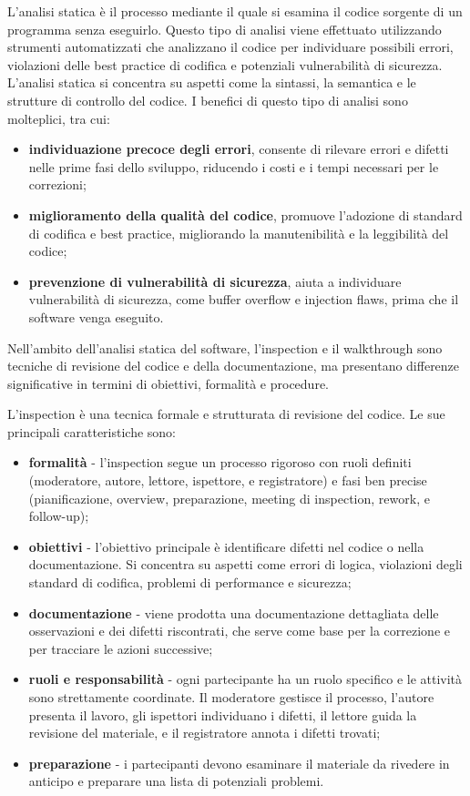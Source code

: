 L'analisi statica è il processo mediante il quale si esamina il codice sorgente di un programma senza eseguirlo. Questo tipo di analisi viene effettuato utilizzando strumenti automatizzati che analizzano il codice per individuare possibili errori, violazioni delle best practice di codifica e potenziali vulnerabilità di sicurezza. L'analisi statica si concentra su aspetti come la sintassi, la semantica e le strutture di controllo del codice. I benefici di questo tipo di analisi sono molteplici, tra cui:
\begin{itemize}
	\item \textbf{individuazione precoce degli errori}, consente di rilevare errori e difetti nelle prime fasi dello sviluppo, riducendo i costi e i tempi necessari per le correzioni;
	\item \textbf{miglioramento della qualità del codice}, promuove l'adozione di standard di codifica e best practice, migliorando la manutenibilità e la leggibilità del codice;
	\item \textbf{prevenzione di vulnerabilità di sicurezza}, aiuta a individuare vulnerabilità di sicurezza, come buffer overflow e injection flaws, prima che il software venga eseguito.
\end{itemize}
Nell'ambito dell'analisi statica del software, l'inspection e il walkthrough sono tecniche di revisione del codice e della documentazione, ma presentano differenze significative in termini di obiettivi, formalità e procedure.

L'inspection è una tecnica formale e strutturata di revisione del codice. Le sue principali caratteristiche sono:
\begin{itemize}
	\item \textbf{formalità} - l'inspection segue un processo rigoroso con ruoli definiti (moderatore, autore, lettore, ispettore, e registratore) e fasi ben precise (pianificazione, overview, preparazione, meeting di inspection, rework, e follow-up);
	\item \textbf{obiettivi} - l'obiettivo principale è identificare difetti nel codice o nella documentazione. Si concentra su aspetti come errori di logica, violazioni degli standard di codifica, problemi di performance e sicurezza;
	\item \textbf{documentazione} - viene prodotta una documentazione dettagliata delle osservazioni e dei difetti riscontrati, che serve come base per la correzione e per tracciare le azioni successive;
	\item \textbf{ruoli e responsabilità} - ogni partecipante ha un ruolo specifico e le attività sono strettamente coordinate. Il moderatore gestisce il processo, l'autore presenta il lavoro, gli ispettori individuano i difetti, il lettore guida la revisione del materiale, e il registratore annota i difetti trovati;
	\item \textbf{preparazione} - i partecipanti devono esaminare il materiale da rivedere in anticipo e preparare una lista di potenziali problemi.
\end{itemize}

